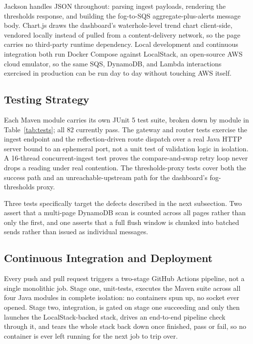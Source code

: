 \documentclass[conference,a4paper]{IEEEtran}
\begin{document}
Jackson handles JSON throughout: parsing ingest payloads, rendering the thresholds response, and building the fog-to-SQS aggregate-plus-alerts message body. Chart.js draws the dashboard's waterhole-level trend chart client-side, vendored locally instead of pulled from a content-delivery network, so the page carries no third-party runtime dependency. Local development and continuous integration both run Docker Compose against LocalStack, an open-source AWS cloud emulator, so the same SQS, DynamoDB, and Lambda interactions exercised in production can be run day to day without touching AWS itself.

\subsection{Testing Strategy}

Each Maven module carries its own JUnit 5 test suite, broken down by module in Table~\ref{tab:tests}; all 82 currently pass. The gateway and router tests exercise the ingest endpoint and the reflection-driven route dispatch over a real Java HTTP server bound to an ephemeral port, not a unit test of validation logic in isolation. A 16-thread concurrent-ingest test proves the compare-and-swap retry loop never drops a reading under real contention. The thresholds-proxy tests cover both the success path and an unreachable-upstream path for the dashboard's fog-thresholds proxy.

Three tests specifically target the defects described in the next subsection. Two assert that a multi-page DynamoDB scan is counted across all pages rather than only the first, and one asserts that a full flush window is chunked into batched sends rather than issued as individual messages.

\subsection{Continuous Integration and Deployment}

Every push and pull request triggers a two-stage GitHub Actions pipeline, not a single monolithic job. Stage one, unit-tests, executes the Maven suite across all four Java modules in complete isolation: no containers spun up, no socket ever opened. Stage two, integration, is gated on stage one succeeding and only then launches the LocalStack-backed stack, drives an end-to-end pipeline check through it, and tears the whole stack back down once finished, pass or fail, so no container is ever left running for the next job to trip over.
\end{document}
